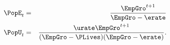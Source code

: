 \begin{eqnarray*}
\PopE_t & = & \frac{\EmpGro^{t+1}}{\EmpGro-\erate} \label{eq:PopEt}
\\ \PopU_t & = & \frac{\urate \EmpGro^{t+1}}{(\EmpGro-\PLives)(\EmpGro-\erate)}. \label{eq:PopUt}
\end{eqnarray*} %
